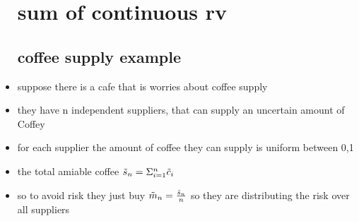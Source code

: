 \documentclass{article}
\begin{document}
\begin{itemize}
\section{sum of continuous rv}
\subsection{coffee supply example}
\item suppose there is a cafe that is worries about coffee supply 
\item they have n independent suppliers, that can supply an uncertain amount of Coffey
\item for each supplier the amount of coffee they can supply is uniform between 0,1 
\item the total amiable coffee $\Tilde{s}_{n}=\Sigma_{i=1}^{n}\Tilde{c}_{i}$
\item so to avoid risk they just buy $\Tilde{m}_{n}=\frac{\Tilde{s}_{n}}{n}$ so they are distributing the risk over all suppliers 

\end{itemize}
\end{document}
